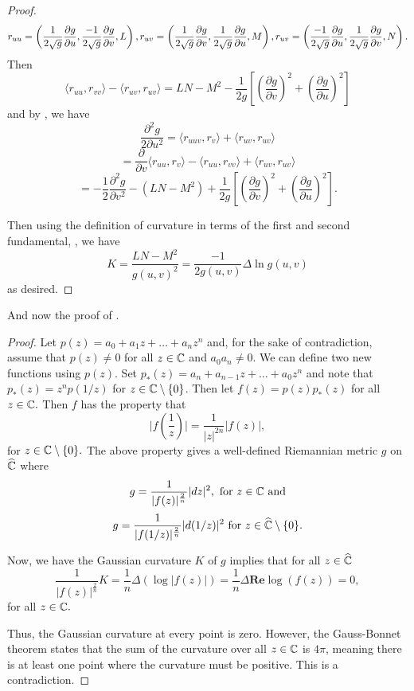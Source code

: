 \begin{proof}
	\begin{equation}\label{eqn:log-curve-proof-seconds}
		r_{uu}=\left(\frac{1}{2\sqrt{g}}\frac{\partial g}{\partial u},\frac{-1}{2\sqrt{g}}\frac{\partial g}{\partial v},L\right),\\
		r_{uv}=\left(\frac{1}{2\sqrt{g}}\frac{\partial g}{\partial v},\frac{1}{2\sqrt{g}}\frac{\partial g}{\partial u},M\right),\\
		r_{uv}=\left(\frac{-1}{2\sqrt{g}}\frac{\partial g}{\partial u},\frac{1}{2\sqrt{g}}\frac{\partial g}{\partial v},N\right).
	\end{equation}
	Then
	$$\langle r_{uu},r_{vv}\rangle -\langle r_{uv},r_{uv}\rangle=LN-M^2-\frac{1}{2g}\left[\left(\frac{\partial g}{\partial v}\right)^2+
	\left(\frac{\partial g}{\partial u}\right)^2\right]$$
	and by , we have
	$$\frac{\partial^2 g}{2\partial u^2}=\langle r_{uuv},r_{v}\rangle+\langle r_{uv},r_{uv}\rangle$$
	$$=\frac{\partial}{\partial v}\langle r_{uu},r_{v}\rangle - \langle r_{uu},r_{vv}\rangle+\langle r_{uv},r_{uv}\rangle$$
	$$=-\frac{1}{2}\frac{\partial^2 g}{\partial v^2}-(LN-M^2)+\frac{1}{2g}\left[\left(\frac{\partial g}{\partial v}\right)^2+
	\left(\frac{\partial g}{\partial u}\right)^2\right].$$
	
	Then using the definition of curvature in terms of the first and second fundamental, ,
	we have
	$$K=\frac{LN-M^2}{g(u,v)^2}=\frac{-1}{2g(u,v)}\Delta \ln g(u,v)$$
	as desired.
\end{proof}



And now the proof of .

\begin{proof}
 Let $p(z)=a_0+a_1z+\ldots + a_nz^n$ and, for the sake of contradiction,
 assume that $p(z)\neq 0$ for all $z\in \mathbb{C}$ and $a_0a_n\neq 0.$
 We can define two new functions using $p(z)$.
 Set $p_*(z)=a_n+a_{n-1}z+\ldots + a_0z^n$ and note that $p_*(z)=z^np(1/z)$ for $z\in \mathbb{C}\setminus\{0\}$.
 Then let $f(z)=p(z)p_*(z)$ for all $z\in \mathbb{C}.$
 Then $f$ has the property that
 $$\bigg | f\left(\frac{1}{z}\right) \bigg |=\frac{1}{|z|^{2n}}|f(z)|,$$ for $z\in \mathbb{C}\setminus\{0\}.$
 The above property gives a well-defined Riemannian metric $g$ on $\widehat{\mathbb{C}}$
 where 
 $$g=\frac{1}{|f(z)|^{\frac{2}{n}}}|dz|^2, \textrm{ for } z\in \mathbb{C} \textrm{ and}$$
 $$g=\frac{1}{|f(1/z)|^{\frac{2}{n}}}|d(1/z)|^2 \textrm{ for } z\in \widehat{\mathbb{C}}\setminus\{0\}.$$
 
 Now, we have the Gaussian curvature $K$ of $g$ implies that for all $z\in \widehat{\mathbb{C}}$
 $$\frac{1}{|f(z)|^{\frac{2}{n}}} K =\frac{1}{n}\Delta(\log |f(z)|)=\frac{1}{n}\Delta \textbf{Re} \log(f(z))=0,$$
 for all $z\in \mathbb{C}.$ 
 
Thus, the Gaussian curvature at every point is zero. However, the Gauss-Bonnet
 theorem states that the sum of the curvature over all $z\in \mathbb{C}$ is $4\pi$, meaning there is at least
 one point where the curvature must be positive. This is a contradiction.
\end{proof}


